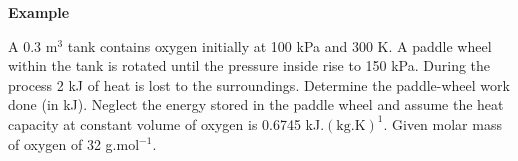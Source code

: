    \begin{MyExample}{\begin{center}{\bf Example}\end{center}}
     \begin{example}\label{Chapter:FirstLaw:Example4}\citep{Rajput_Book}
       A 0.3 m$^{3}$  tank contains oxygen initially at 100 kPa and 300 K. A paddle wheel within the tank is rotated until the pressure inside rise to 150 kPa. During the process 2 kJ of heat is lost to the surroundings. Determine the paddle-wheel work done (in kJ). Neglect the energy stored in the paddle wheel and assume the heat capacity at constant volume of oxygen is 0.6745 kJ.$\left(\text{kg.K}\right)^{1}$. Given molar mass of oxygen of 32 g.mol$^{-1}$.
     \end{example}
     

\end{MyExample}

